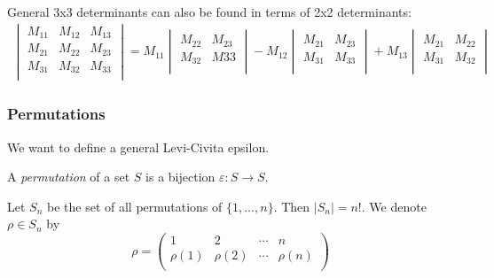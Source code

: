 \documentclass{../template/note}
\begin{document}
    \begin{remark*}
        General 3x3 determinants can also be found in terms of 2x2 determinants:
        \begin{align*}
            \begin{vmatrix}
            M_{11} & M_{12} & M_{13} \\
            M_{21} & M_{22} & M_{23} \\
            M_{31} & M_{32} & M_{33} \\
            \end{vmatrix} = M_{11} \begin{vmatrix}
             M_{22} & M_{23} \\
             M_{32} & M{33} \\
            \end{vmatrix} - M_{12} \begin{vmatrix}
             M_{21} & M_{23} \\
             M_{31} & M_{33} \\
            \end{vmatrix} + M_{13} \begin{vmatrix}
             M_{21} & M_{22} \\
             M_{31} & M_{32} \\
            \end{vmatrix}
        \end{align*}
    \end{remark*}
    
    \subsubsection{Permutations}

    We want to define a general Levi-Civita epsilon.

    \begin{definition}
        A \emph{permutation} of a set \(S\) is a bijection \(\varepsilon: S \to S\).
    \end{definition}
    
    \begin{definition}
        Let \(S_n\) be the set of all permutations of \(\{1, \dots, n\}\). Then \(|S_n| = n!\). We denote \(\rho \in S_n\) by
        \[
            \rho = \begin{pmatrix}
             1 & 2 & \cdots & n \\
             \rho(1) & \rho(2) & \cdots & \rho(n) \\
            \end{pmatrix}
        \]
    \end{definition}
    
\end{document}
